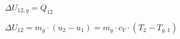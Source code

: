 \( \Delta U_{12,g} = Q_{12} \)  

\( \Delta U_{12} = m_g \cdot (u_{2} - u_{1}) = m_g \cdot c_V \cdot (T_2 - T_{g,1}) \)